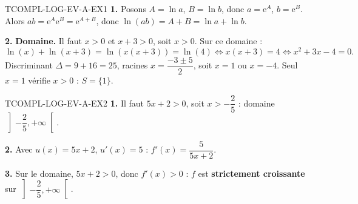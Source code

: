 \begin{corrige}{TCOMPL-LOG-EV-A-EX1}
\textbf{1.} Posons $A=\ln a$, $B=\ln b$, donc $a=\mathrm{e}^A$, $b=\mathrm{e}^B$. Alors $ab=\mathrm{e}^A\mathrm{e}^B=\mathrm{e}^{A+B}$, donc $\ln(ab)=A+B=\ln a+\ln b$.

\textbf{2.} \textbf{Domaine.} Il faut $x>0$ et $x+3>0$, soit $x>0$. Sur ce domaine :
\[
  \ln(x)+\ln(x+3) = \ln(x(x+3)) = \ln(4) \iff x(x+3)=4 \iff x^2+3x-4=0.
\]
Discriminant $\Delta=9+16=25$, racines $x=\dfrac{-3\pm5}{2}$, soit $x=1$ ou $x=-4$. Seul $x=1$ vérifie $x>0$ : $S=\{1\}$.
\end{corrige}

\begin{corrige}{TCOMPL-LOG-EV-A-EX2}
\textbf{1.} Il faut $5x+2>0$, soit $x>-\dfrac{2}{5}$ : domaine $\left]-\dfrac{2}{5},+\infty\right[$.

\textbf{2.} Avec $u(x)=5x+2$, $u'(x)=5$ : $f'(x) = \dfrac{5}{5x+2}$.

\textbf{3.} Sur le domaine, $5x+2>0$, donc $f'(x)>0$ : $f$ est \textbf{strictement croissante} sur $\left]-\dfrac{2}{5},+\infty\right[$.
\end{corrige}
